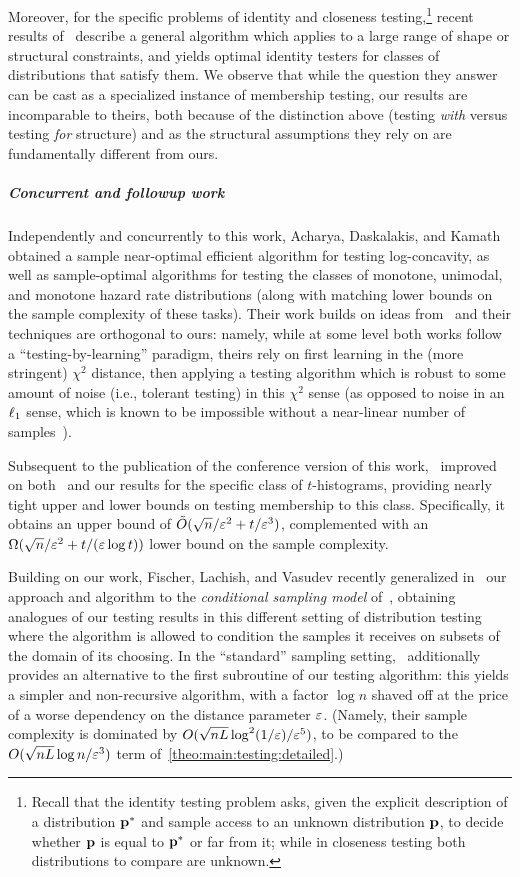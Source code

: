 Moreover, for the specific problems of identity and closeness testing,\footnote{Recall that the identity testing problem asks, given the explicit description of a distribution $\D^\ast$ and sample access to an unknown distribution $\D$, to decide whether $\D$ is equal to $\D^\ast$ or far from it; while in closeness testing both distributions to compare are unknown.} recent results of~\cite{DKN:15,DKN:15:FOCS} describe a general algorithm which applies to a large range of shape or structural constraints, and yields optimal identity testers for classes of distributions that satisfy them. We observe that while the question they answer can be cast as a specialized instance of membership testing, our results are incomparable to theirs, both because of the distinction above (testing \emph{with} versus testing \emph{for} structure) and as the structural assumptions they rely on are fundamentally different from ours.

\subparagraph{Concurrent and followup work} 
Independently and concurrently to this work, Acharya, Daskalakis, and Kamath~\cite{ADK:15} obtained a sample near-optimal efficient algorithm for testing log-concavity, as well as sample-optimal algorithms for testing the classes of monotone, unimodal, and monotone hazard rate distributions (along with matching lower bounds on the sample complexity of these tasks). Their work builds on ideas from~\cite{AD:15} and their techniques are orthogonal to ours: namely, while at some level both works follow a ``testing-by-learning'' paradigm, theirs rely on first learning in the (more stringent) $\chi^2$ distance, then applying a testing algorithm which is robust to some amount of noise (i.e., tolerant testing) in this $\chi^2$ sense (as opposed to noise in an $\lp[1]$ sense, which is known to be impossible without a near-linear number of samples~\cite{ValiantValiant:10lb}).

Subsequent to the publication of the conference version of this work,~\cite{Canonne:16} improved on both~\cite{ILR:12} and our results for the specific class of $t$-histograms, providing nearly tight upper and lower bounds on testing membership to this class. Specifically, it obtains an upper bound of $\tilde{O}(\sqrt{n}/\eps^2 + t/\eps^3)$, complemented with an $\Omega(\sqrt{n}/\eps^2+t/(\eps\log t))$ lower bound on the sample complexity.

Building on our work, Fischer, Lachish, and Vasudev recently generalized in~\cite{FischerLV:16} our approach and algorithm to the \emph{conditional sampling model} of~\cite{CFGM:13,CRS:15}, obtaining analogues of our testing results in this different setting of distribution testing where the algorithm is allowed to condition the samples it receives on subsets of the domain of its choosing. In the ``standard'' sampling setting,~\cite{FischerLV:16} additionally provides an alternative to the first subroutine of our testing algorithm: this yields a simpler and non-recursive algorithm, with a factor $\log n$ shaved off at the price of a worse dependency on the distance parameter $\eps$. (Namely, their sample complexity is dominated by $O(\sqrt{nL}\log^2(1/\eps)/{\eps^5})$, to be compared to the $O(\sqrt{nL}\log n/{\eps^3})$ term of~\cref{theo:main:testing:detailed}.)

